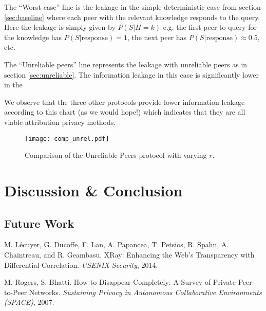 \documentclass{article}
\newcommand{\secref}[1]{section \ref{sec:#1}}
\begin{document}
The ``Worst case'' line is the leakage in the simple deterministic case from
\secref{baseline} where each peer with the relevant knowledge responds to the
query. Here the leakage is simply given by $P(S|H=k)$ e.g. the first peer to
query for the knowledge has $P(S|\text{response})=1$, the next peer has
$P(S|\text{response})\approx 0.5$, etc.

The ``Unreliable peers'' line represents the leakage with unreliable peers as in
\secref{unreliable}. The information leakage in this case is significantly lower
in the 

We observe that the three other
protocols provide lower information leakage according to this chart (as we would
hope!) which indicates that they are all viable attribution privacy methods.


\begin{figure}%
    \centering
	\texttt{[image: comp\_unrel.pdf]}
	\caption{Comparison of the Unreliable Peers protocol with varying $r$.}
    \label{fig:comp_unrel}%
\end{figure}

\section{Discussion \& Conclusion}

\subsection{Future Work}

\begin{thebibliography}{9}

	M. L\'ecuyer, G. Ducoffe, F. Lan, A. Papancea, T. Petsios, R. Spahn, A. Chaintreau, and R. Geambasu.
	XRay: Enhancing the Web's Transparency with Differential Correlation.
	\emph{USENIX Security}, 2014.

	M. Rogers, S. Bhatti.
	How to Disappear Completely: A Survey of Private Peer-to-Peer Networks.
	\emph{Sustaining Privacy in Autonomous Collaborative Environments (SPACE)}, 2007.

\end{thebibliography}
\end{document}
